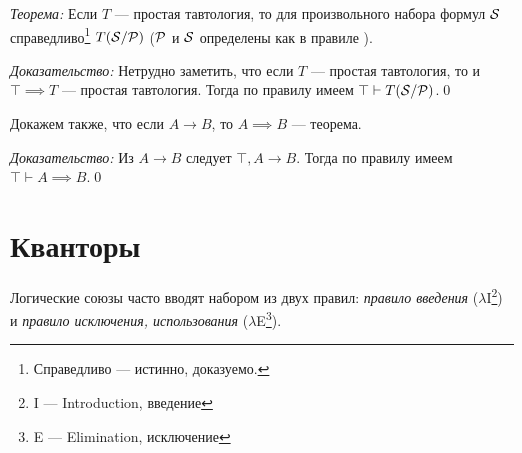 {\it Теорема:}
Если $T$ --- простая тавтология, то
для произвольного набора формул $\mathcal S$ справедливо\footnote{
  Справедливо --- истинно, доказуемо.
} $T(\mathcal S/\mathcal P)$
($\mathcal P$ и $\mathcal S$ определены как в правиле \taut{}).

  {\it Доказательство:} Нетрудно заметить, что если
$T$ --- простая тавтология, то и
${\top\implies T}$ --- простая тавтология. Тогда по правилу \taut{} имеем
$\top\vdash T(\mathcal S/\mathcal P)$.\qed

Докажем также, что если $A\to B$, то $A\implies B$ --- теорема.

{\it Доказательство:}
Из $A\to B$ следует $\top,A\to B$. Тогда по правилу \implic{} имеем
$\top\vdash A\implies B$.\qed

% 
% 
% 
% 
% 

\section{Кванторы}

\newcommand\Aii{$\forall$I}
\newcommand\Aee{$\forall$E}
\newcommand\Eii{$\exists$I}
\newcommand\Eee{$\exists$E}

Логические союзы часто вводят набором из двух правил:
{\it правило введения} ($\lambda$I\footnote{I --- Introduction, введение}) и
{\it правило исключения, использования}
($\lambda$E\footnote{E --- Elimination, исключение}).

